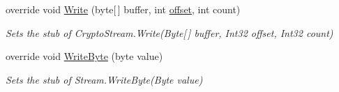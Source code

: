 \begin{DoxyCompactItemize}
override void \hyperlink{class_system_1_1_security_1_1_cryptography_1_1_fakes_1_1_stub_crypto_stream_a9ca0ae8c747ef572a186bee8308548fc}{Write} (byte\mbox{[}$\,$\mbox{]} buffer, int \hyperlink{jquery-1_810_82_8js_a4a9f594d20d927164551fc7fa4751a2f}{offset}, int count)
\begin{DoxyCompactList}\small\item\em Sets the stub of Crypto\-Stream.\-Write(\-Byte\mbox{[}$\,$\mbox{]} buffer, Int32 offset, Int32 count)\end{DoxyCompactList}\item 
override void \hyperlink{class_system_1_1_security_1_1_cryptography_1_1_fakes_1_1_stub_crypto_stream_abaceb23b2a7bb7e68cfd25671ba65c10}{Write\-Byte} (byte value)
\begin{DoxyCompactList}\small\item\em Sets the stub of Stream.\-Write\-Byte(\-Byte value)\end{DoxyCompactList}\end{DoxyCompactItemize}
